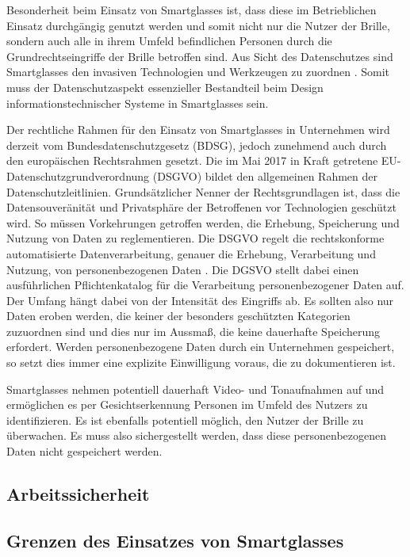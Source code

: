 Besonderheit beim Einsatz von Smartglasses ist, dass diese im Betrieblichen Einsatz durchgängig genutzt werden und somit nicht nur die Nutzer der Brille, sondern auch alle in ihrem Umfeld befindlichen Personen durch die Grundrechtseingriffe der Brille betroffen sind. Aus Sicht des Datenschutzes sind Smartglasses den invasiven Technologien und Werkzeugen zu zuordnen \cite{Berkemeier2017}. Somit muss der Datenschutzaspekt essenzieller Bestandteil beim Design informationstechnischer Systeme in Smartglasses sein. 

Der rechtliche Rahmen für den Einsatz von Smartglasses in Unternehmen wird derzeit vom Bundesdatenschutzgesetz (BDSG), jedoch zunehmend auch durch den europäischen Rechtsrahmen gesetzt. Die im Mai 2017 in Kraft getretene EU-Datenschutzgrundverordnung (DSGVO) bildet den allgemeinen Rahmen der Datenschutzleitlinien. Grundsätzlicher Nenner der Rechtsgrundlagen ist, dass die Datensouveränität und Privatsphäre der Betroffenen vor Technologien geschützt wird. So müssen Vorkehrungen getroffen werden, die Erhebung, Speicherung und Nutzung von Daten zu reglementieren.
Die DSGVO regelt die rechtskonforme automatisierte Datenverarbeitung, genauer die Erhebung, Verarbeitung und Nutzung, von personenbezogenen Daten \cite{Berkemeier2017}. Die DGSVO stellt dabei einen ausführlichen  Pflichtenkatalog für die Verarbeitung personenbezogener Daten auf. Der Umfang hängt dabei von der Intensität des Eingriffs ab. Es sollten also nur Daten eroben werden, die keiner der besonders geschützten Kategorien zuzuordnen sind und dies nur im Aussmaß, die keine dauerhafte Speicherung erfordert. Werden personenbezogene Daten durch ein Unternehmen gespeichert, so setzt dies immer eine explizite Einwilligung voraus, die zu dokumentieren ist.

Smartglasses nehmen potentiell dauerhaft Video- und Tonaufnahmen auf und ermöglichen es per Gesichtserkennung Personen im Umfeld des Nutzers zu identifizieren. 
Es ist ebenfalls potentiell möglich, den Nutzer der Brille zu überwachen. Es muss also sichergestellt werden, dass diese personenbezogenen Daten nicht gespeichert werden.
%
%
\subsection{Arbeitssicherheit}
%
%
\subsection{Grenzen des Einsatzes von Smartglasses}

